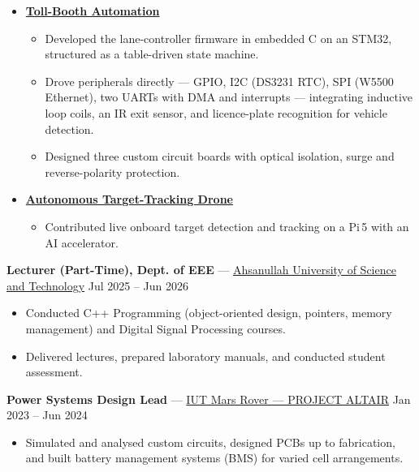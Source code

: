 \documentclass[10pt]{article}
\newenvironment{subprojects}
  {\begin{itemize}[label={}, leftmargin=0.9em, itemsep=3pt, topsep=2pt]}
  {\end{itemize}}
\begin{document}
\begin{subprojects}
    \item \textbf{\href{https://www.youtube.com/watch?v=tsnFWpL0otE&list=PL83KI7SnKe-WVnVozQg_rh70uutLMiiNe&index=3}{Toll-Booth
    Automation}}
    \begin{itemize}
        \item Developed the lane-controller firmware in embedded C on an STM32, structured as a
        table-driven state machine.
        \item Drove peripherals directly --- GPIO, I2C (DS3231 RTC), SPI (W5500 Ethernet), two UARTs
        with DMA and interrupts --- integrating inductive loop coils, an IR exit sensor, and
        licence-plate recognition for vehicle detection.
        \item Designed three custom circuit boards with optical isolation, surge and
        reverse-polarity protection.
    \end{itemize}

    \item \textbf{\href{https://www.youtube.com/watch?v=MLrD0SuG4Q0}{Autonomous Target-Tracking
    Drone}}
    \begin{itemize}
        \item Contributed live onboard target detection and tracking on a Pi\,5 with an AI
        accelerator.
    \end{itemize}

\end{subprojects}

\vspace{2pt}
\textbf{Lecturer (Part-Time), Dept. of EEE} ---
\href{https://www.aust.edu/}{Ahsanullah University of Science and Technology}
\hfill Jul 2025 -- Jun 2026
\begin{itemize}
    \item Conducted C++ Programming (object-oriented design, pointers, memory management) and
    Digital Signal Processing courses.
    \item Delivered lectures, prepared laboratory manuals, and conducted student assessment.
\end{itemize}

\textbf{Power Systems Design Lead} ---
\href{https://www.youtube.com/@projectAltair/}{IUT Mars Rover --- PROJECT ALTAIR}
\hfill Jan 2023 -- Jun 2024
\begin{itemize}
    \item Simulated and analysed custom circuits, designed PCBs up to fabrication, and built
    battery management systems (BMS) for varied cell arrangements.
\end{itemize}
\end{document}
